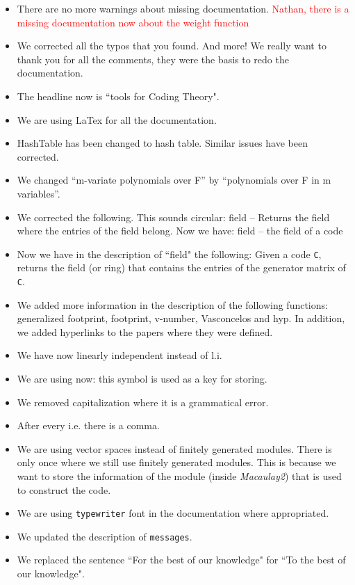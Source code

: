 \documentclass[12pt]{amsart}
\theoremstyle{plain}
\begin{document}
\begin{itemize}
\item There are no more warnings about missing documentation. \textcolor{red}{Nathan, there is a missing documentation now about the weight function}
\item We corrected all the typos that you found. And more! We really want to thank you for all the comments, they were the basis to redo the documentation.
\item The headline now is ``tools for Coding Theory".
\item We are using LaTex for all the documentation.
\item HashTable has been changed to hash table. Similar issues have been corrected.
\item We changed ``m-variate polynomials over F'' by ``polynomials over F in m variables''.
\item We corrected the following. This sounds circular:	field -- Returns the field where the entries of the field belong.
Now we have: field -- the field of a code
\item Now we have in the description of ``field" the following: Given a code {\tt C}, returns the field (or ring) that contains the entries of the generator matrix of {\tt C}.
\item We added more information in the description of the following functions: generalized footprint, footprint, v-number, Vasconcelos and hyp. In addition, we added hyperlinks to the papers where they were defined.
\item We have now linearly independent instead of l.i.
\item We are using now: this symbol is used as a key for storing.
\item We removed capitalization where it is a grammatical error.
\item After every i.e. there is a comma.
\item We are using vector spaces instead of finitely generated modules. There is only once where we still use finitely generated modules. This is because we want to store the information of the module (inside {\it Macaulay2}) that is used to construct the code.
\item We are using {\tt typewriter} font in the documentation where appropriated.
\item We updated the description of {\tt messages}.
\item We replaced the sentence ``For the best of our knowledge" for ``To the best of our knowledge".

\end{itemize}
\end{document}
